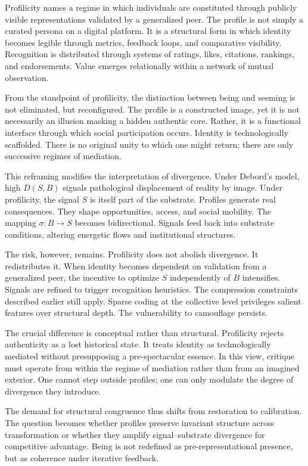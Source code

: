 \documentclass[11pt]{article}
\begin{document}
Profilicity names a regime in which individuals are constituted through publicly visible representations validated by a generalized peer. The profile is not simply a curated persona on a digital platform. It is a structural form in which identity becomes legible through metrics, feedback loops, and comparative visibility. Recognition is distributed through systems of ratings, likes, citations, rankings, and endorsements. Value emerges relationally within a network of mutual observation.

From the standpoint of profilicity, the distinction between being and seeming is not eliminated, but reconfigured. The profile is a constructed image, yet it is not necessarily an illusion masking a hidden authentic core. Rather, it is a functional interface through which social participation occurs. Identity is technologically scaffolded. There is no original unity to which one might return; there are only successive regimes of mediation.

This reframing modifies the interpretation of divergence. Under Debord’s model, high $D(S,B)$ signals pathological displacement of reality by image. Under profilicity, the signal $S$ is itself part of the substrate. Profiles generate real consequences. They shape opportunities, access, and social mobility. The mapping $\sigma : B \to S$ becomes bidirectional. Signals feed back into substrate conditions, altering energetic flows and institutional structures.

The risk, however, remains. Profilicity does not abolish divergence. It redistributes it. When identity becomes dependent on validation from a generalized peer, the incentive to optimize $S$ independently of $B$ intensifies. Signals are refined to trigger recognition heuristics. The compression constraints described earlier still apply. Sparse coding at the collective level privileges salient features over structural depth. The vulnerability to camouflage persists.

The crucial difference is conceptual rather than structural. Profilicity rejects authenticity as a lost historical state. It treats identity as technologically mediated without presupposing a pre-spectacular essence. In this view, critique must operate from within the regime of mediation rather than from an imagined exterior. One cannot step outside profiles; one can only modulate the degree of divergence they introduce.

The demand for structural congruence thus shifts from restoration to calibration. The question becomes whether profiles preserve invariant structure across transformation or whether they amplify signal–substrate divergence for competitive advantage. Being is not redefined as pre-representational presence, but as coherence under iterative feedback.
\end{document}
